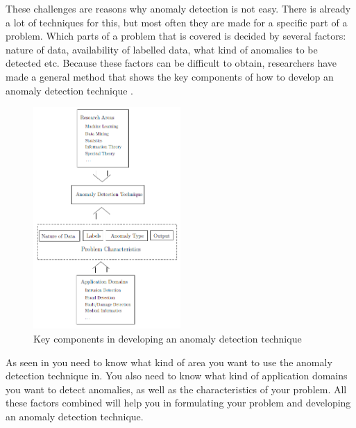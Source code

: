 \documentclass[english, a4paper]{report}
\begin{document}
{{{            \par
            These challenges are reasons why anomaly detection is not easy. There is already a lot of techniques for this, but most often they are made for a specific part of a problem. Which parts of a problem that is covered is decided by several factors: nature of data, availability of labelled data, what kind of anomalies to be detected etc. Because these factors can be difficult to obtain, researchers have made a general method that shows the key components of how to develop an anomaly detection technique \cite{anomalyDetection}.
            
            \begin{figure}[H]
                \centering 
                \includegraphics[width=0.5\textwidth]{anomalyDetectionTechnique}
                \caption{Key components in developing an anomaly detection technique \cite{anomalyDetection}}
                \label{fig:anomalyDetectionTechnique}
            \end{figure}
        }
        
        As seen in  you need to know what kind of area you want to use the anomaly detection technique in. You also need to know what kind of application domains you want to detect anomalies, as well as the characteristics of your problem. All these factors combined will help you in formulating your problem and developing an anomaly detection technique. 
        \par
            
}}
\end{document}
